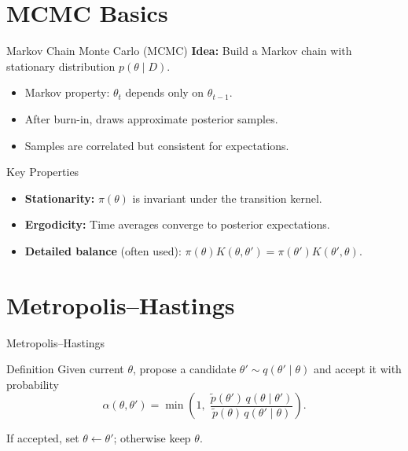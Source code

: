 \documentclass[aspectratio=169]{ntuabeamer}
\begin{document}
	
	\section{MCMC Basics}
	\begin{frame}{Markov Chain Monte Carlo (MCMC)}
		\textbf{Idea:} Build a Markov chain with stationary distribution $p(\theta\mid D)$.
		\begin{itemize}
			\item Markov property: $\theta_t$ depends only on $\theta_{t-1}$.
			\item After burn-in, draws approximate posterior samples.
			\item Samples are correlated but consistent for expectations.
		\end{itemize}
	\end{frame}
	
	\begin{frame}{Key Properties}
		\begin{itemize}
			\item \textbf{Stationarity:} $\pi(\theta)$ is invariant under the transition kernel.
			\item \textbf{Ergodicity:} Time averages converge to posterior expectations.
			\item \textbf{Detailed balance} (often used): $\pi(\theta)K(\theta,\theta')=\pi(\theta')K(\theta',\theta)$.
		\end{itemize}
	\end{frame}
	
	\section{Metropolis--Hastings}
	\begin{frame}{Metropolis--Hastings}
		\begin{block}{Definition}
			Given current $\theta$, propose a candidate $\theta'\sim q(\theta'\mid\theta)$ and accept it with probability
			\[
			\alpha(\theta,\theta') = \min\!\left(1,\; \frac{\tilde p(\theta')\,q(\theta\mid\theta')}{\tilde p(\theta)\,q(\theta'\mid\theta)}\right).
			\]
		\end{block}
		If accepted, set $\theta\leftarrow\theta'$; otherwise keep $\theta$.
	\end{frame}
	
\end{document}
